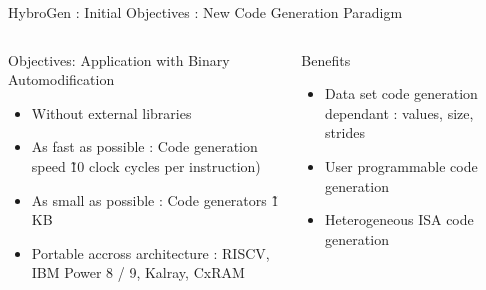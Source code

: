 \begin{Frame}{HybroGen : Initial Objectives : New Code Generation Paradigm}
 \begin{columns}[t]
  \begin{column}{\BW}
    \begin{block}{Objectives: Application with Binary Automodification}
      \begin{itemize}
        \item Without external libraries
        \item As fast as possible : Code generation speed \~ 10 clock
          cycles per instruction)
        \item As small as possible : Code generators \~ 1 KB
        \item Portable accross architecture : RISCV, IBM Power 8 / 9,
          Kalray, CxRAM
      \end{itemize}
    \end{block}
  \end{column}
  \begin{column}{\BW}
    \begin{block}{Benefits}
      \begin{itemize}
      \item Data set code generation dependant : values, size, strides
      \item User programmable code generation
      \item Heterogeneous ISA code generation
      \end{itemize}
    \end{block}
  \end{column}

 \end{columns}
\end{Frame}
